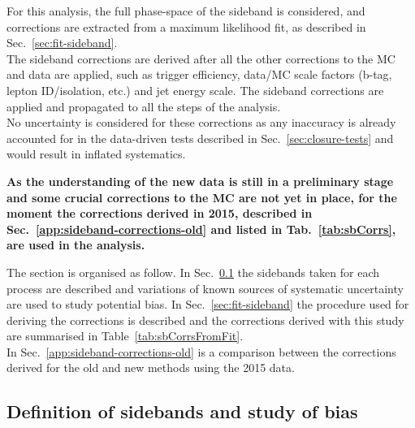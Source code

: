 For this analysis, the full phase-space of the sideband is considered, 
and corrections are extracted from a maximum likelihood fit, as described in Sec.~\ref{sec:fit-sideband}. \\
The sideband corrections are derived after all the other corrections to the MC and data are applied, 
such as trigger efficiency, data/MC scale factors (b-tag, lepton ID/isolation, etc.) and jet energy scale. 
The sideband corrections are applied and propagated to all the steps of the analysis.\\
No uncertainty is considered for these corrections as any inaccuracy is already accounted 
for in the data-driven tests described in Sec.~\ref{sec:closure-tests} and would result in inflated systematics. 

\textbf{As the understanding of the new data is still in a preliminary stage and some crucial corrections to the MC 
are not yet in place, for the moment the corrections derived in 2015, described in Sec.~\ref{app:sideband-corrections-old} and listed in Tab.~\ref{tab:sbCorrs}, are used in the analysis. }

The section is organised as follow. 
In Sec.~\ref{sec:bias-study-sideband} the sidebands taken for each process are described and variations of known sources of 
systematic uncertainty are used to study potential bias. In Sec.~\ref{sec:fit-sideband} the procedure used for deriving
the corrections is described and the corrections derived with this study are summarised in Table~\ref{tab:sbCorrsFromFit}.\\
In Sec.~\ref{app:sideband-corrections-old} is a comparison 
between the corrections derived for the old and new methods using the 2015 data.

\subsection{Definition of sidebands and study of bias}
\label{sec:bias-study-sideband}
